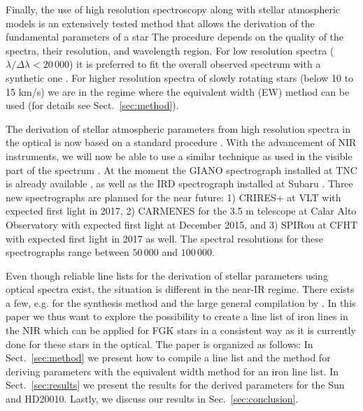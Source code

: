 \documentclass{aa}
\begin{document}
Finally, the use of high resolution spectroscopy along with stellar
atmospheric models is an extensively tested method that allows
the derivation of the fundamental parameters of a star \citep[see
e.g.][]{Santos13} The procedure depends on the quality of the spectra,
their resolution, and wavelength region. For low resolution spectra
($\lambda/\Delta\lambda < 20\,000$) it is preferred to fit the overall
observed spectrum with a synthetic one \citep[see e.g.][]{Recio2006}.
For higher resolution spectra of slowly rotating stars (below 10 to 15
\si{km/s}) we are in the regime where the equivalent width (EW) method
can be used (for details see Sect.~\ref{sec:method}).

The derivation of stellar atmospheric parameters from high
resolution spectra in the optical is now based on a standard
procedure \citep[see e.g.][]{Valenti2005,Sousa2008a}. With the
advancement of NIR instruments, we will now be able to use a similar
technique as used in the visible part of the spectrum \citep[see
e.g.][]{Melendez1999,Tsantaki2013,Sousa2008a,Bensby2014,Mucciarelli2013}
. At the moment the GIANO spectrograph installed at TNC is already
available \citep{GIANO}, as well as the IRD spectrograph installed at
Subaru \citep{IRD}. Three new spectrographs are planned for the near
future: 1) CRIRES+ at VLT \citep{CRIRESp} with expected first light in
2017, 2) CARMENES for the 3.5 m telescope at Calar Alto Observatory
\citep{CARMENES} with expected first light at December 2015, and 3)
SPIRou at CFHT \citep{SPIROU1,SPIROU2} with expected first light in 2017
as well. The spectral resolutions for these spectrographs range between
$50\,000$ and $100\,000$.

Even though reliable line lists for the derivation of stellar parameters
using optical spectra exist, the situation is different in the near-IR
regime. There exists a few, e.g. \citet{Onehag2012,Rhodin2015} for the
synthesis method and the large general compilation by \citet{Melendez1999}.
In this paper we thus want to explore the possibility to create
a line list of iron lines in the NIR which can be applied for FGK stars
in a consistent way as it is currently done for these stars in the
optical. The paper is organized as follows: In Sect.~\ref{sec:method}
we present how to compile a line list and the method for deriving parameters
with the equivalent width method for an iron line list. In
Sect.~\ref{sec:results} we present the results for the derived parameters
for the Sun and HD20010. Lastly, we discuss our results in Sec.~\ref{sec:conclusion}.
\end{document}
